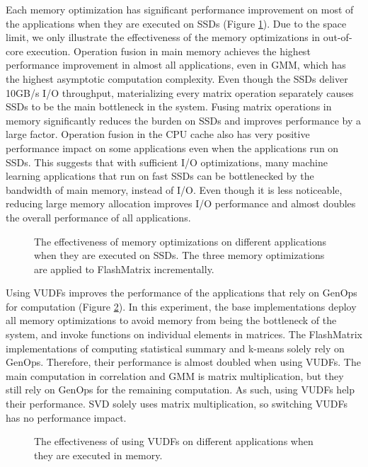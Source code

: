 Each memory optimization has significant performance improvement on most of
the applications when they are executed on SSDs (Figure \ref{perf:opts}).
Due to the space limit, we only illustrate the effectiveness of the memory
optimizations in out-of-core execution. Operation fusion in main memory achieves
the highest performance improvement in almost all applications, even in GMM,
which has the highest asymptotic computation complexity. Even though the SSDs
deliver 10GB/s I/O throughput, materializing every matrix operation separately
causes SSDs to be the main bottleneck in the system.
Fusing matrix operations in memory significantly reduces the burden on SSDs and
improves performance by a large factor. Operation fusion in the CPU cache also
has very positive performance impact on some applications even when
the applications run on SSDs. This suggests that with sufficient I/O optimizations,
many machine learning applications that run on fast SSDs can be bottlenecked by
the bandwidth of main memory, instead of I/O. Even though it is less noticeable,
reducing large memory allocation improves I/O performance and almost doubles
the overall performance of all applications.

\begin{figure}
	\begin{center}
		\footnotesize
		\vspace{-15pt}
		
		\vspace{-10pt}
		\caption{The effectiveness of memory optimizations on different
			applications when they are executed on SSDs. The three memory
		optimizations are applied to FlashMatrix incrementally.}
		\label{perf:opts}
	\end{center}
\end{figure}

Using VUDFs improves the performance of the applications that rely on GenOps
for computation (Figure \ref{perf:opts_CPU}). In this experiment, the base
implementations deploy all memory optimizations to avoid memory from being
the bottleneck of the system,
and invoke functions on individual elements in
matrices. The FlashMatrix implementations of computing statistical summary
and k-means solely rely on GenOps. Therefore, their performance is almost doubled
when using VUDFs. The main computation in correlation and GMM is matrix
multiplication, but they still rely on GenOps for the remaining computation.
As such, using VUDFs help their performance. SVD solely uses matrix
multiplication, so switching VUDFs has no performance impact.

\begin{figure}
	\begin{center}
		\footnotesize
		\vspace{-15pt}
		
		\vspace{-10pt}
		\caption{The effectiveness of using VUDFs on different applications
		when they are executed in memory.}
		\label{perf:opts_CPU}
	\end{center}
\end{figure}
